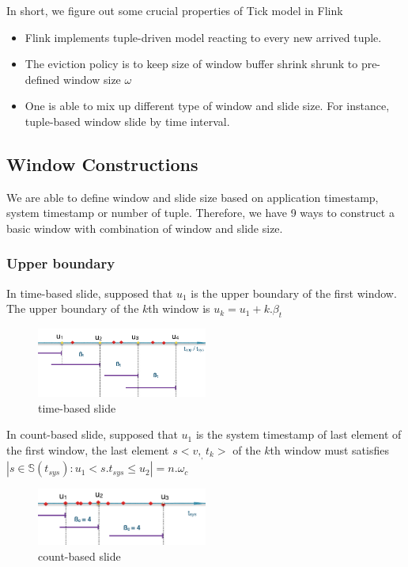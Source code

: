 In short, we figure out some crucial properties of Tick model in Flink
\begin{itemize}
\item Flink implements tuple-driven model reacting to every new arrived tuple.
\item The eviction policy is to keep size of window buffer shrink shrunk to pre-defined window size $\omega$
\item One is able to mix up different type of window and slide size. For instance, tuple-based window slide by time interval.
\end{itemize}



\subsection{Window Constructions}
We are able to define window and slide size based on application timestamp, system timestamp or number of tuple. Therefore, we have 9 ways to construct a basic window with combination of window and slide size.


\subsubsection{Upper boundary}
In time-based slide,  supposed that $u_1$ is  the upper boundary of the first window. 
The upper boundary of the $k$th window is $u_k = u_1 + k.\beta_t$

\begin{figure}[htbp!] 
\centering    
\includegraphics[width=0.5\textwidth]{timebased_slide}
\caption{time-based slide}
\label{fig:timebased_slide}
\end{figure}

In count-based slide, supposed that $u_1$ is the system timestamp of last element of the first window, the last element $s<v,_,t_k>$ of the $k$th window must satisfies $|{s \in \mathbb{S}(t_{sys}): u_1 < s.t_{sys} \leq u_2}| = n.\omega_c$

\begin{figure}[htbp!] 
\centering    
\includegraphics[width=0.5\textwidth]{countbased_slide}
\caption{count-based slide}
\label{fig:countbased_slide}
\end{figure}

